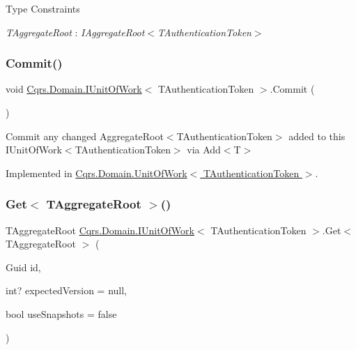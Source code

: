 \begin{Desc}
\item[Type Constraints]\begin{description}
\item[{\em T\+Aggregate\+Root} : {\em I\+Aggregate\+Root$<$T\+Authentication\+Token$>$}]\end{description}
\end{Desc}
\mbox{\label{interfaceCqrs_1_1Domain_1_1IUnitOfWork_ade600c9bf9e8380c24eaf1e7e0df6e01_ade600c9bf9e8380c24eaf1e7e0df6e01}} 
\subsubsection{\texorpdfstring{Commit()}{Commit()}}
{\footnotesize\ttfamily void \hyperlink{interfaceCqrs_1_1Domain_1_1IUnitOfWork}{Cqrs.\+Domain.\+I\+Unit\+Of\+Work}$<$ T\+Authentication\+Token $>$.Commit (\begin{DoxyParamCaption}{ }\end{DoxyParamCaption})}



Commit any changed Aggregate\+Root$<$\+T\+Authentication\+Token$>$ added to this I\+Unit\+Of\+Work$<$\+T\+Authentication\+Token$>$ via Add$<$\+T$>$ 



Implemented in \hyperlink{classCqrs_1_1Domain_1_1UnitOfWork_a7401e41dd8ce4457551c252ca6402d31_a7401e41dd8ce4457551c252ca6402d31}{Cqrs.\+Domain.\+Unit\+Of\+Work$<$ T\+Authentication\+Token $>$}.

\mbox{\label{interfaceCqrs_1_1Domain_1_1IUnitOfWork_aee78f81d472577a65356bc1c05207180_aee78f81d472577a65356bc1c05207180}} 
\subsubsection{\texorpdfstring{Get$<$ T\+Aggregate\+Root $>$()}{Get< TAggregateRoot >()}}
{\footnotesize\ttfamily T\+Aggregate\+Root \hyperlink{interfaceCqrs_1_1Domain_1_1IUnitOfWork}{Cqrs.\+Domain.\+I\+Unit\+Of\+Work}$<$ T\+Authentication\+Token $>$.Get$<$ T\+Aggregate\+Root $>$ (\begin{DoxyParamCaption}\item[{Guid}]{id,  }\item[{int?}]{expected\+Version = {\ttfamily null},  }\item[{bool}]{use\+Snapshots = {\ttfamily false} }\end{DoxyParamCaption})}



